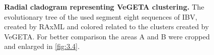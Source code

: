     \begin{figure}[!htb]
        \centering
        \caption[Radial cladogram representing VeGETA clustering]{\textbf{Radial cladogram representing VeGETA clustering.} The evolutionary tree of the used segment eight sequences of \gls{IBV}, created by RAxML and colored related to the clusters created by VeGETA. For better comparison the areas A and B were cropped and enlarged in \autoref{fig:3.4}.}
        \label{fig:3.3}
    \end{figure}
    
